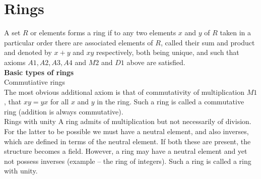 \section{Rings}
A set $R$ or elements forms a ring if to any two elements $x$ and $y$ of $R$ taken in a particular order there are associated elements of $R$, called their sum and product and denoted by 
$x + y $ and $xy$ respectively, both being unique, and such that axioms  $A1, A2, A3, A4$ and $M2$ and $D1$ above are satisfied. \\

{\bf Basic types of rings}\\
{\twelveit Commutiative rings}\\
The most obvious additional axiom is that of commutativity of multiplication $M1$, that $xy = yx$ for all $x$ and $y$ in the ring. Such a ring is called a {\twelveit commutative ring} (addition is always commutative). \\

{\twelveit Rings with unity}
A ring admits of multiplication but not necessarily of division. For the latter to be possible we must have a neutral element, and also inverses, which are defined in terms of the neutral element. 
If both these are present, the structure becomes a {\twelveit field}. However, a ring may have a neutral element and yet not possess inverses (example -- the ring of integers). Such a ring is called 
a {\twelveit ring with unity}.